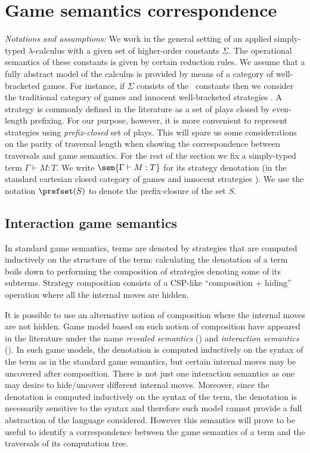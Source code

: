 \section{Game semantics correspondence}
\label{sec:gamesemcorresp}

{\it Notations and assumptions:}
We work in the general setting of an applied
simply-typed $\lambda$-calculus with a given set of higher-order
constants $\Sigma$. The operational semantics of these constants is
given by certain reduction rules. We assume that a fully abstract
model of the calculus is provided by means of a category of
well-bracketed games. For instance, if $\Sigma$ consists
of the \pcf\ constants then we consider the traditional
category of games and innocent well-bracketed strategies
\cite{hylandong_pcf,abramsky94full}.
A strategy is commonly defined in the literature as a set of plays closed by
even-length prefixing. For our purpose, however, it is more convenient to represent strategies using \emph{prefix-closed} set of plays. This will spare us some considerations on the parity of traversal length when showing the correspondence between traversals and game semantics.
 For the rest of the section we fix a simply-typed term $\Gamma \vdash M :T$. We write $\sem{\Gamma \vdash M : T}$ for its strategy denotation (in the standard cartesian closed category of games and innocent strategies \cite{abramsky94full, hylandong_pcf}). We use the notation $\prefset(S)$ to denote the prefix-closure of the set $S$.

\subsection{Interaction game semantics}
\label{sec:interaction_semantics}

In standard game semantics, terms are denoted by strategies that are computed
inductively on the structure of the term: calculating the denotation of a term boils down to
performing the composition of strategies denoting some of its subterms. Strategy composition consists of a
CSP-like ``composition + hiding'' operation where all the internal moves are hidden.

It is possible to use an alternative notion of composition where the internal moves are not hidden.
Game model based on such notion of composition have appeared in the literature under the name \emph{revealed
semantics} (\cite{willgreenlandthesis})  and \emph{interaction semantics} (\cite{DBLP:conf/sas/DimovskiGL05}).
In such game models, the denotation is computed inductively on the syntax of the term as in the standard game semantics, but certain internal
moves may be uncovered after composition. There is not just one interaction semantics as one may desire to hide/uncover different internal moves.
Moreover, since the denotation is computed inductively on the syntax of the term, the denotation is necessarily sensitive to the syntax and therefore such model cannot provide a full abstraction of the language considered.
However this semantics will prove to be useful to identify a correspondence between the game semantics of a term
and the traversals of its computation tree.

